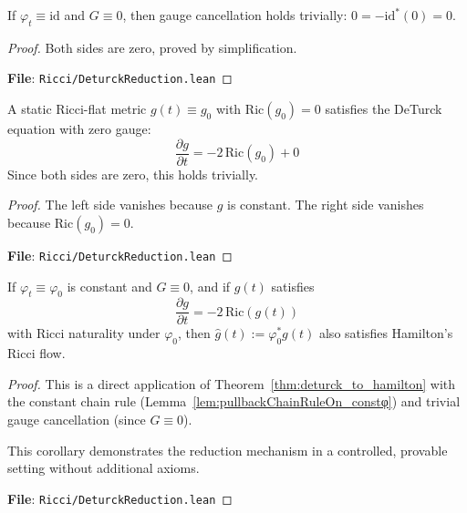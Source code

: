 \begin{lemma}
\label{lem:gaugeCancellationOn_id_zero}
\leanok
{}
If $\varphi_t \equiv \mathrm{id}$ and $G \equiv 0$, then gauge cancellation holds trivially: $0 = -\mathrm{id}^*(0) = 0$.
\end{lemma}

\begin{proof}
\leanok
{}
Both sides are zero, proved by simplification.

\textbf{File}: \texttt{Ricci/DeturckReduction.lean}
\end{proof}

\begin{lemma}
\label{lem:deturckEqOnWithGauge_ricciFlat_static}
\leanok
{}
A static Ricci-flat metric $g(t) \equiv g_0$ with $\mathrm{Ric}(g_0) = 0$ satisfies the DeTurck equation with zero gauge:
\[ \frac{\partial g}{\partial t} = -2\,\mathrm{Ric}(g_0) + 0 \]
Since both sides are zero, this holds trivially.
\end{lemma}

\begin{proof}
\leanok
{}
The left side vanishes because $g$ is constant. The right side vanishes because $\mathrm{Ric}(g_0) = 0$.

\textbf{File}: \texttt{Ricci/DeturckReduction.lean}
\end{proof}

\begin{corollary}
\label{cor:deturck_to_hamilton_constφ_noGauge}
\leanok
{}
If $\varphi_t \equiv \varphi_0$ is constant and $G \equiv 0$, and if $g(t)$ satisfies
\[ \frac{\partial g}{\partial t} = -2\,\mathrm{Ric}(g(t)) \]
with Ricci naturality under $\varphi_0$, then $\hat{g}(t) := \varphi_0^* g(t)$ also satisfies Hamilton's Ricci flow.
\end{corollary}

\begin{proof}
\leanok
{}
This is a direct application of Theorem~\ref{thm:deturck_to_hamilton} with the constant chain rule (Lemma~\ref{lem:pullbackChainRuleOn_constφ}) and trivial gauge cancellation (since $G \equiv 0$).

This corollary demonstrates the reduction mechanism in a controlled, provable setting without additional axioms.

\textbf{File}: \texttt{Ricci/DeturckReduction.lean}
\end{proof}

